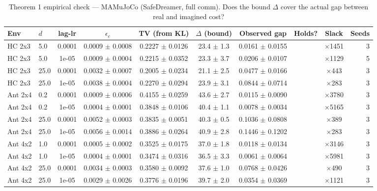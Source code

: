 \documentclass[10pt]{article}
\newcommand{\cmark}{\checkmark}
\begin{document}
\begin{table}[h]
\centering
\caption{Theorem 1 empirical check --- MAMuJoCo (SafeDreamer, full comm).
    Does the bound $\Delta$ cover the actual gap between real and imagined cost?}
\small
\begin{tabular}{llcccccccr}
\toprule
Env & $d$ & lag-lr & $\epsilon_c$ & TV (from KL) & $\Delta$ (bound) & Observed gap & Holds? & Slack & Seeds \\
\midrule
        HC 2x3 & 5.0 & 0.0001 & 0.0009 $\pm$ 0.0008 & 0.2227 $\pm$ 0.0126 & 23.4 $\pm$ 1.3 & 0.0161 $\pm$ 0.0155 & \cmark & $\times$1451 & 3 \\
        HC 2x3 & 5.0 & 1e-05 & 0.0009 $\pm$ 0.0004 & 0.2215 $\pm$ 0.0352 & 23.3 $\pm$ 3.7 & 0.0206 $\pm$ 0.0107 & \cmark & $\times$1129 & 5 \\
        HC 2x3 & 25.0 & 0.0001 & 0.0032 $\pm$ 0.0007 & 0.2005 $\pm$ 0.0234 & 21.1 $\pm$ 2.5 & 0.0477 $\pm$ 0.0166 & \cmark & $\times$443 & 3 \\
        HC 2x3 & 25.0 & 1e-05 & 0.0038 $\pm$ 0.0004 & 0.2270 $\pm$ 0.0294 & 23.9 $\pm$ 3.1 & 0.0844 $\pm$ 0.0714 & \cmark & $\times$283 & 3 \\
        Ant 2x4 & 0.2 & 0.0001 & 0.0009 $\pm$ 0.0006 & 0.4155 $\pm$ 0.0259 & 43.6 $\pm$ 2.7 & 0.0115 $\pm$ 0.0090 & \cmark & $\times$3780 & 3 \\
        Ant 2x4 & 0.2 & 1e-05 & 0.0004 $\pm$ 0.0001 & 0.3848 $\pm$ 0.0106 & 40.4 $\pm$ 1.1 & 0.0078 $\pm$ 0.0034 & \cmark & $\times$5165 & 3 \\
        Ant 2x4 & 25.0 & 0.0001 & 0.0052 $\pm$ 0.0003 & 0.3835 $\pm$ 0.0051 & 40.3 $\pm$ 0.5 & 0.1036 $\pm$ 0.0808 & \cmark & $\times$389 & 3 \\
        Ant 2x4 & 25.0 & 1e-05 & 0.0056 $\pm$ 0.0014 & 0.3886 $\pm$ 0.0264 & 40.9 $\pm$ 2.8 & 0.1446 $\pm$ 0.1202 & \cmark & $\times$283 & 3 \\
        Ant 4x2 & 1.0 & 0.0001 & 0.0005 $\pm$ 0.0002 & 0.3525 $\pm$ 0.0175 & 37.0 $\pm$ 1.8 & 0.0118 $\pm$ 0.0134 & \cmark & $\times$3146 & 3 \\
        Ant 4x2 & 1.0 & 1e-05 & 0.0004 $\pm$ 0.0001 & 0.3474 $\pm$ 0.0316 & 36.5 $\pm$ 3.3 & 0.0061 $\pm$ 0.0064 & \cmark & $\times$5981 & 3 \\
        Ant 4x2 & 25.0 & 0.0001 & 0.0034 $\pm$ 0.0003 & 0.3580 $\pm$ 0.0092 & 37.6 $\pm$ 1.0 & 0.0768 $\pm$ 0.0426 & \cmark & $\times$490 & 3 \\
        Ant 4x2 & 25.0 & 1e-05 & 0.0029 $\pm$ 0.0026 & 0.3776 $\pm$ 0.0196 & 39.7 $\pm$ 2.0 & 0.0354 $\pm$ 0.0369 & \cmark & $\times$1121 & 3 \\
\bottomrule
\end{tabular}
\end{table}
\end{document}
